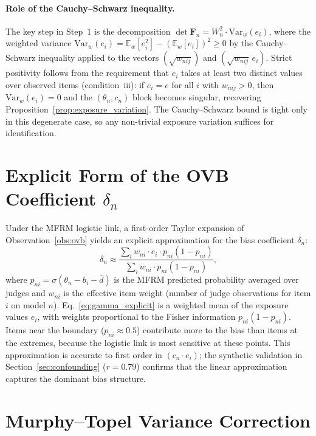 \paragraph{Role of the Cauchy--Schwarz inequality.} The key step in Step~1 is the decomposition $\det \mathbf{F}_n = W_n^2 \cdot \mathrm{Var}_w(e_i)$, where the weighted variance $\mathrm{Var}_w(e_i) = \mathbb{E}_w[e_i^2] - (\mathbb{E}_w[e_i])^2 \geq 0$ by the Cauchy--Schwarz inequality applied to the vectors $(\sqrt{w_{nij}})$ and $(\sqrt{w_{nij}}\, e_i)$. Strict positivity follows from the requirement that $e_i$ takes at least two distinct values over observed items (condition~iii): if $e_i = e$ for all $i$ with $w_{nij} > 0$, then $\mathrm{Var}_w(e_i) = 0$ and the $(\theta_n, c_n)$ block becomes singular, recovering Proposition~\ref{prop:exposure_variation}. The Cauchy--Schwarz bound is tight only in this degenerate case, so any non-trivial exposure variation suffices for identification.


\section{Explicit Form of the OVB Coefficient $\delta_n$}
\label{app:gamma}

Under the MFRM logistic link, a first-order Taylor expansion of Observation~\ref{obs:ovb} yields an explicit approximation for the bias coefficient $\delta_n$:
%
\begin{equation}
\label{eq:gamma_explicit}
\delta_n \approx \frac{\sum_{i} w_{ni} \cdot e_i \cdot p_{ni}(1 - p_{ni})}{\sum_{i} w_{ni} \cdot p_{ni}(1 - p_{ni})},
\end{equation}
%
where $p_{ni} = \sigma(\theta_n - b_i - \bar{d})$ is the MFRM predicted probability averaged over judges and $w_{ni}$ is the effective item weight (number of judge observations for item $i$ on model $n$). Eq.~\ref{eq:gamma_explicit} is a weighted mean of the exposure values $e_i$, with weights proportional to the Fisher information $p_{ni}(1 - p_{ni})$. Items near the boundary ($p_{ni} \approx 0.5$) contribute more to the bias than items at the extremes, because the logistic link is most sensitive at these points. This approximation is accurate to first order in $(c_n \cdot e_i)$; the synthetic validation in Section~\ref{sec:confounding} ($r = 0.79$) confirms that the linear approximation captures the dominant bias structure.


\section{Murphy--Topel Variance Correction}
\label{app:murphy_topel}

